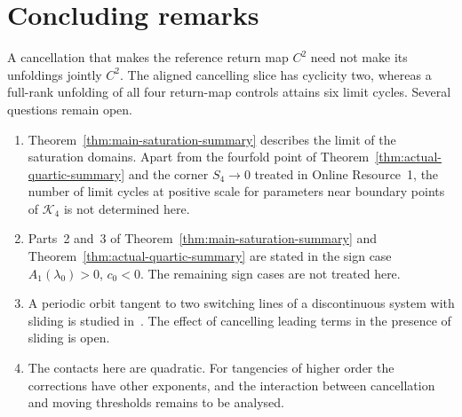 \section{Concluding remarks}\label{sec:concluding}

A cancellation that makes the reference return map $C^2$ need not make its
unfoldings jointly $C^2$. The aligned cancelling slice has cyclicity two,
whereas a full-rank unfolding of all four return-map controls attains six
limit cycles. Several questions remain open.
\begin{enumerate}
\item Theorem~\ref{thm:main-saturation-summary} describes the limit of the
saturation domains. Apart from the fourfold point of
Theorem~\ref{thm:actual-quartic-summary} and the corner $S_4\to0$ treated in
Online Resource~1, the number of limit cycles at positive scale for parameters
near boundary points of $\mathcal K_4$ is not determined here.
\item Parts~2 and~3 of Theorem~\ref{thm:main-saturation-summary} and
Theorem~\ref{thm:actual-quartic-summary} are stated in the sign case
$A_1(\lambda_0)>0$, $c_0<0$. The remaining sign cases are not treated here.
\item A periodic orbit tangent to two switching lines of a discontinuous
system with sliding is studied in~\cite{roitenberg2025}. The effect of
cancelling leading terms in the presence of sliding is open.
\item The contacts here are quadratic. For tangencies of higher order the
corrections have other exponents, and the interaction between cancellation
and moving thresholds remains to be analysed.
\end{enumerate}
